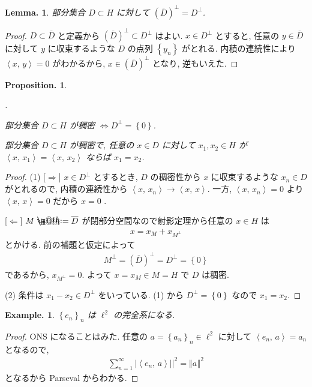 \documentclass[openany, a4paper, oneside]{jsbook}
\makeatletter
\newcounter{enum2}
\renewenvironment{enumerate}{%
\begin{list}%
{%
\arabic{enum2}.\ \,%
}%
{%
\usecounter{enum2}
\setlength{\itemindent}{0pt}%
\setlength{\leftmargin}{15pt}%
\setlength{\rightmargin}{0pt}%
\setlength{\labelsep}{0pt}%
\setlength{\labelwidth}{6pt}%
\setlength{\itemsep}{0pt}%
\setlength{\parsep}{0pt}%
\setlength{\listparindent}{0pt}%
}
}{%
\end{list}%
}
\newcommand*{\defeq}{\mathrel{\rlap{%
\raisebox{0.3ex}{$\m@th\cdot$}}%
\raisebox{-0.3ex}{$\m@th\cdot$}}%
=}
\theoremstyle{break}
\newtheorem{lem}[thm]{Lemma.}
\newtheorem{prop}[thm]{Proposition.}
\theoremstyle{breakdefn}
\newtheorem{ex}[thm]{Example.}
\newcommand{\abs}[1]{\left|#1\right|}
\newcommand{\norm}[1]{\left\Vert#1\right\Vert}
\newcommand{\rbk}[1]{\left (#1\right)}
\newcommand{\cbk}[1]{\left\{#1\right\}}
\newcommand{\bkt}[2]{\left\langle#1,\,#2\right\rangle}
\makeatother
\begin{document}
\begin{lem}
 部分集合 $D \subset H$ に対して $(\overline{D})^\perp = D^\perp$.
\end{lem}
\begin{proof}
$D \subset \overline{D}$ と定義から $(\overline{D})^\perp \subset D^\perp$ はよい.
$x \in D^\perp$ とすると, 任意の $y \in \overline{D}$ に対して $y$ に収束するような $D$ の点列 $\cbk{y_n}$ がとれる.
内積の連続性により $\bkt{x}{y} = 0$ がわかるから,
$x \in (\overline{D})^\perp$ となり, 逆もいえた.
\end{proof}

\begin{prop}
\begin{enumerate}
\item 部分集合 $D \subset H$ が稠密 $\Longleftrightarrow D^\perp = \cbk{0}$.
\item 部分集合 $D \subset H$ が稠密で, 任意の $x \in D$ に対して $x_{1}, x_{2} \in H$ が
    $\bkt{x}{x_1} = \bkt{x}{x_2}$ ならば $x_{1} = x_{2}$.
\end{enumerate}
\end{prop}
\begin{proof}
(1) [$\Longrightarrow$]
$x \in D^\perp$ とするとき, $D$ の稠密性から $x$ に収束するような $x_{n} \in D$ がとれるので,
内積の連続性から $\bkt{x}{x_n} \to \bkt{x}{x}$.
一方, $\bkt{x}{x_n} = 0$ より $\bkt{x}{x} = 0$ だから $x = 0$ .

[$\Longleftarrow$]
$M \defeq \overline{D}$ が閉部分空間なので射影定理から任意の $x \in H$ は
\begin{align}
 x
 =
 x_{M} + x_{M^\perp}
\end{align}
とかける.
前の補題と仮定によって
\begin{align}
 M^\perp
 = \rbk{\overline{D}}^\perp
 =
 D^\perp
 =
 \cbk{0}
\end{align}
であるから, $x_{M^\perp} = 0$.
よって $x = x_{M} \in M = H$ で $D$ は稠密.

(2) 条件は $x_1 - x_2 \in D^\perp$ をいっている.
(1) から $D^\perp = \cbk{0}$ なので $x_1 = x_2$.
\end{proof}

\begin{ex}
 $\cbk{e_n}_n$ は $\ell^2$ の完全系になる.
\end{ex}
\begin{proof}
ONS になることはみた.
任意の $a = \cbk{a_{n}}_n \in \ell^2$ に対して $\bkt{e_n}{a} = a_n$ となるので,
\begin{align}
 \sum_{n=1}^\infty \abs{\bkt{e_n}{a}}|^2
 =
 \norm{a}^2
\end{align}
となるから Parseval からわかる.
\end{proof}
\end{document}
